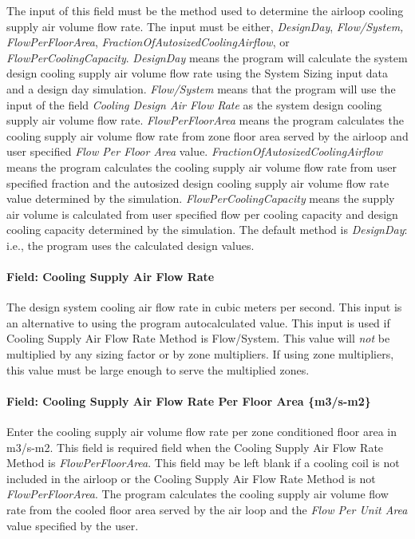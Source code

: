 The input of this field must be the method used to determine the airloop cooling supply air volume flow rate. The input must be either, \emph{DesignDay}, \emph{Flow/System,} \emph{FlowPerFloorArea}, \emph{FractionOfAutosizedCoolingAirflow}, or \emph{FlowPerCoolingCapacity}. \emph{DesignDay} means the program will calculate the system design cooling supply air volume flow rate using the System Sizing input data and a design day simulation. \emph{Flow/System} means that the program will use the input of the field \emph{Cooling Design Air Flow Rate} as the system design cooling supply air volume flow rate. \emph{FlowPerFloorArea} means the program calculates the cooling supply air volume flow rate from zone floor area served by the airloop and user specified \emph{Flow Per Floor Area} value. \emph{FractionOfAutosizedCoolingAirflow} means the program calculates the cooling supply air volume flow rate from user specified fraction and the autosized design cooling supply air volume flow rate value determined by the simulation. \emph{FlowPerCoolingCapacity} means the supply air volume is calculated from user specified flow per cooling capacity and design cooling capacity determined by the simulation. The default method is \emph{DesignDay}: i.e., the program uses the calculated design values.

\paragraph{Field: Cooling Supply Air Flow Rate}\label{field-cooling-supply-air-flow-rate}

The design system cooling air flow rate in cubic meters per second. This input is an alternative to using the program autocalculated value. This input is used if Cooling Supply Air Flow Rate Method is Flow/System. This value will \emph{not} be multiplied by any sizing factor or by zone multipliers. If using zone multipliers, this value must be large enough to serve the multiplied zones.

\paragraph{Field: Cooling Supply Air Flow Rate Per Floor Area \{m3/s-m2\}}\label{field-cooling-supply-air-flow-rate-per-floor-area-m3s-m2}

Enter the cooling supply air volume flow rate per zone conditioned floor area in m3/s-m2. This field is required field when the Cooling Supply Air Flow Rate Method is \emph{FlowPerFloorArea}. This field may be left blank if a cooling coil is not included in the airloop or the Cooling Supply Air Flow Rate Method is not \emph{FlowPerFloorArea}. The program calculates the cooling supply air volume flow rate from the cooled floor area served by the air loop and the \emph{Flow Per Unit Area} value specified by the user.

